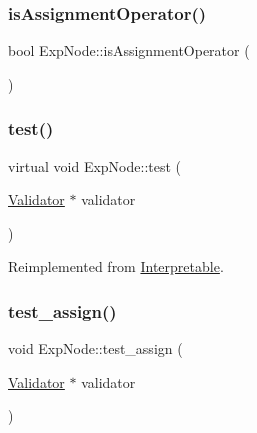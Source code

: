 \mbox{\label{classExpNode_a39851ed23963fe02e427a7c8c4d61739}} 
\subsubsection{\texorpdfstring{is\+Assignment\+Operator()}{isAssignmentOperator()}}
{\footnotesize\ttfamily bool Exp\+Node\+::is\+Assignment\+Operator (\begin{DoxyParamCaption}{ }\end{DoxyParamCaption})}

\mbox{\label{classExpNode_a8fb8302d5ce438a9ad0f58161be2a1c9}} 
\subsubsection{\texorpdfstring{test()}{test()}}
{\footnotesize\ttfamily virtual void Exp\+Node\+::test (\begin{DoxyParamCaption}\item[{\hyperlink{classValidator}{Validator} $\ast$}]{validator }\end{DoxyParamCaption})\hspace{0.3cm}{\ttfamily [virtual]}}



Reimplemented from \hyperlink{classInterpretable_a32f547aaf68dcbab993284d3257ab010}{Interpretable}.

\mbox{\label{classExpNode_aac9d0df6bb5cae7d98a085269cf47937}} 
\subsubsection{\texorpdfstring{test\+\_\+assign()}{test\_assign()}}
{\footnotesize\ttfamily void Exp\+Node\+::test\+\_\+assign (\begin{DoxyParamCaption}\item[{\hyperlink{classValidator}{Validator} $\ast$}]{validator }\end{DoxyParamCaption})}

\mbox{\label{classExpNode_a84953d6f8662cdbcbe84aeb875d87939}} 

